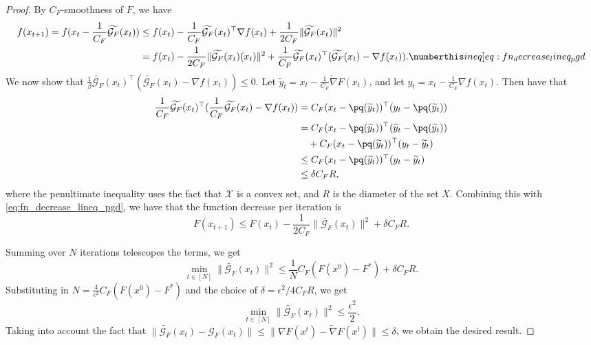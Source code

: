 \begin{proof}
    By $C_F$-smoothness of $F$, we have 
\begin{align*}
f(x_{t+1})  =f(x_t-\frac{1}{C_F}\widetilde{\mathcal{G}_F}(x_t))
 & \leq f(x_t)-\frac{1}{C_F}\widetilde{\mathcal{G}_F}(x_t)^{\top}\nabla f(x_t)+\frac{1}{2C_F}\|\widetilde{\mathcal{G}_F}(x_t)\|^{2}\\
 & =f(x_t)-\frac{1}{2C_F}\|\widetilde{\mathcal{G}_F}(x_t)(x_t)\|^{2}+\frac{1}{C_F}\widetilde{\mathcal{G}_F}(x_t)^{\top}(\widetilde{\mathcal{G}_F}(x_t)-\nabla f(x_t)).\numberthis\label[ineq]{eq:fn_decrease_lineq_pgd}
\end{align*}
We now show that $\frac{1}{\beta}\widetilde{\mathcal{G}_F}(x_t)^{\top}(\widetilde{\mathcal{G}_F}(x_t)-\nabla f(x_t))\leq0.$ Let $\widetilde{y}_t = x_t-\frac{1}{C_F}\widetilde{\nabla}F(x_t)$, and let $y_t = x_t-\frac{1}{C_F}{\nabla}f(x_t)$. 
Then have that 
\begin{align*}
\frac{1}{C_F}\widetilde{\mathcal{G}_F}(x_t)^{\top}(\frac{1}{C_F}\widetilde{\mathcal{G}_F}(x_t)-\nabla f(x_t)) & =C_F(x_t-\pq(\widetilde{y}_t))^{\top}(y_t - \pq(\widetilde{y}_t))\\
 & = C_F(x_t-\pq(\widetilde{y}_t))^\top (\widetilde{y}_t - \pq(\widetilde{y}_t)) \\
 &\quad +C_F(x_t-\pq(\widetilde{y}_t))^\top(y_t - \widetilde{y}_t)\\
&\leq C_F(x_t-\pq(\widetilde{y}_t))^\top(y_t - \widetilde{y}_t)\\
&\leq \delta C_F  R,
\end{align*}
where the penultimate inequality uses the fact that $\mathcal{X}$ is a convex set, and $R$ is the diameter of the set $X$. Combining this with \cref{eq:fn_decrease_lineq_pgd}, we have that the function decrease per iteration is 
\[ F(x_{t+1})\leq F(x_t)-\frac{1}{2C_F}\|\widetilde{\mathcal{G}_F}(x_t)\|^{2} + \delta C_F R. \] 

Summing over $N$ iterations telescopes the terms, we get 
$$\min_{t\in[N]}\|\widetilde{\mathcal{G}_F}(x_t)\|^{2}\leq \frac{1}{N} C_F (F(x^0)-F^*) + \delta C_F R.$$
Substituting in $N=\frac{4}{\epsilon^2}C_F (F(x^0)-F^*)$  and the choice of $\delta = \epsilon^2/4C_F R$, we get 
$$\min_{t\in[N]}\|\widetilde{\mathcal{G}_F}(x_t)\|^{2}\leq \frac{\epsilon^2}{2}.$$
Taking into account the fact that $\|\widetilde{\mathcal{G}_F}(x_t)- \mathcal{G}_F (x_t) \|\leq \|\nabla F(x^t)-\widetilde{\nabla} F(x^t)\|\leq \delta$,  we obtain the desired result. 

\end{proof}

